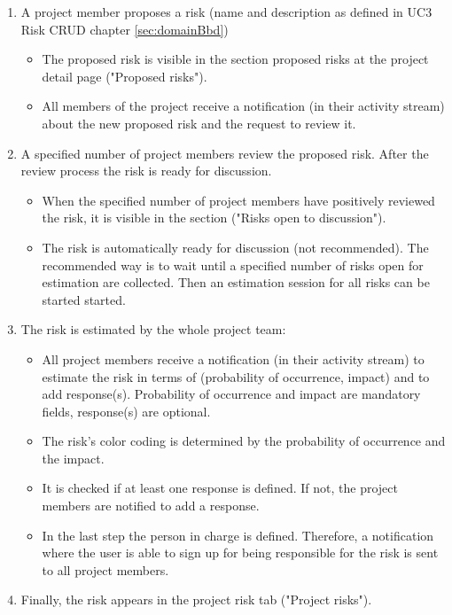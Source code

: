 \begin{enumerate}
	\vspace{-3mm}
	\setlength\itemsep{-1em}
	
	\item A project member proposes a risk (name and description as defined in UC3 Risk CRUD chapter \ref{sec:domainBbd})
	\begin{itemize}
		\vspace{-3mm}
		\setlength\itemsep{-1em}
		
		\item The proposed risk is visible in the section proposed risks at the project detail page ("Proposed risks").
		\item All members of the project receive a notification (in their activity stream) about the new proposed risk and the request to review it.
	\end{itemize}
	
	\item A specified number of project members review the proposed risk. After the review process the risk is ready for discussion.
	\begin{itemize}
		\vspace{-3mm}
		\setlength\itemsep{-1em}
		
		\item When the specified number of project members have positively reviewed the risk, it is visible in the section ("Risks open to discussion").
		\item The risk is automatically ready for discussion (not recommended). The recommended way is to wait until a specified number of risks open for estimation are collected. Then an estimation session for all risks can be started started.
	\end{itemize}
	
	\item The risk is estimated by the whole project team:
	\begin{itemize}
		\vspace{-3mm}
		\setlength\itemsep{-1em}
		
		\item All project members receive a notification (in their activity stream) to estimate the risk in terms of (probability of occurrence, impact) and to add response(s). Probability of occurrence and impact are mandatory fields, response(s) are optional.
		\item The risk's color coding is determined by the probability of occurrence and the impact.
		\item It is checked if at least one response is defined. If not, the project members are notified to add a response.
		\item In the last step the person in charge is defined. Therefore, a notification where the user is able to sign up for being responsible for the risk is sent to all project members.  
	\end{itemize}
	
	\item Finally, the risk appears in the project risk tab ("Project risks").
\end{enumerate}


